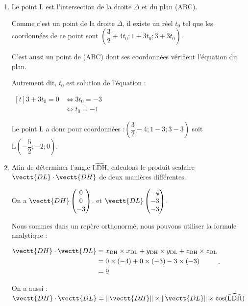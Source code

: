 \begin{enumerate}
\begin{enumerate}
	\end{enumerate}
	
	
	\item Le point L  est l'intersection de la droite $\Delta$ et du plan (ABC).
	
	Comme c'est un point de la droite $\Delta$, il existe un réel $t_0$ tel que les coordonnées de ce point sont $\left( \dfrac{3}{2} + 4t_0 ; 1+3t_0 ; 3+3t_0 \right) $.
	
	C'est aussi un point de (ABC) dont ses coordonnées vérifient l'équation du plan.
	
	Autrement dit, $t_0$ est solution de l'équation :
	
	$\begin{aligned}[t]
		 3 + 3t_0  = 0
		&\iff 3t_0 = -3 \\
		&\iff t_0 = -1
	\end{aligned}$
	
	Le point L a donc pour coordonnées :\quad $\left( \dfrac{3}{2} - 4  ; 1-3  ; 3-3  \right) $ \quad  soit $\mathrm{L}\left(-\dfrac{5}{2} ; -2 ; 0\right) $.

	
	\item  Afin de déterminer l'angle $\widehat{\mathrm{LDH}}$, calculons le produit scalaire $\vectt{DL} \cdot \vectt{DH}$ de deux manières différentes. 
	
On a  $\vectt{DH} \begin{pmatrix} 0 \\ 0\\ -3\end{pmatrix} $.
	\quad et  \quad $\vectt{DL} \begin{pmatrix} -4  \\ -3\\ -3 \end{pmatrix} $.
	
	
	
	Nous sommes dans un repère orthonormé, nous pouvons utiliser la formule analytique : 
	
	$\begin{aligned}  \vectt{DH} \cdot \vectt{DL} &= x_{\mathrm{DH}}\times x_{\mathrm{DL}} + y_{\mathrm{DH}}\times y_{\mathrm{DL}} +z_{\mathrm{DH}}\times z_{\mathrm{DL}}\\
		&= 0\times (-4) + 0 \times (-3) -3 \times (-3)\\
		&= 9
		\end{aligned}$. 
		
		
		
		
		On a aussi : 
$	\vectt{DH} \cdot \vectt{DL}=\left\|\vectt{DH}\right\|\times\left\|\vectt{DL}\right\|\times \cos(\widehat{\mathrm{LDH}})$


\end{enumerate}

